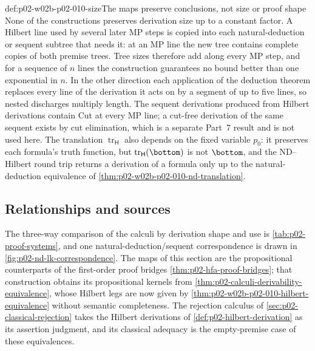 \begin{hbwarning}{def:p02-w02b-p02-010-size}{The maps preserve conclusions, not size or proof shape}
None of the constructions preserves derivation size up to a constant
factor.  A Hilbert line used by several later MP steps is copied into each
natural-deduction or sequent subtree that needs it: at an MP line the new
tree contains complete copies of both premise trees.  Tree sizes therefore
add along every MP step, and for a sequence of \(n\) lines the construction
guarantees no bound better than one exponential in \(n\).  In
the other direction each application of the deduction theorem replaces
every line of the derivation it acts on by a segment of up to five lines, so
nested discharges multiply length.  The sequent derivations produced from
Hilbert derivations contain Cut at every MP line; a cut-free derivation of
the same sequent exists by cut elimination, which is a separate Part~7
result and is not used here.  The translation \(\operatorname{tr}_{\mathsf H}\)
also depends on the fixed variable \(p_0\): it preserves each formula's truth
function, but \(\operatorname{tr}_{\mathsf H}(\bottom)\) is not \(\bottom\),
and the ND--Hilbert round trip returns a derivation of a formula only
up to the natural-deduction equivalence of
\cref{thm:p02-w02b-p02-010-nd-translation}.
\end{hbwarning}

\subsection{Relationships and sources}
\label{sec:p02-w02b-p02-010-relations}

The three-way comparison of the calculi by derivation shape and use is
\cref{tab:p02-proof-systems}, and one natural-deduction/sequent
correspondence is drawn in \cref{fig:p02-nd-lk-correspondence}.  The maps of
this section are the propositional counterparts of the first-order proof
bridges \cref{thm:p02-hfa-proof-bridges}; that construction obtains its
propositional kernels from \cref{thm:p02-calculi-derivability-equivalence},
whose Hilbert legs are now given by
\cref{thm:p02-w02b-p02-010-hilbert-equivalence} without semantic
completeness.  The rejection calculus of
\cref{sec:p02-classical-rejection} takes the Hilbert derivations of
\cref{def:p02-hilbert-derivation} as its assertion judgment, and its
classical adequacy is the empty-premise case of these equivalences.


